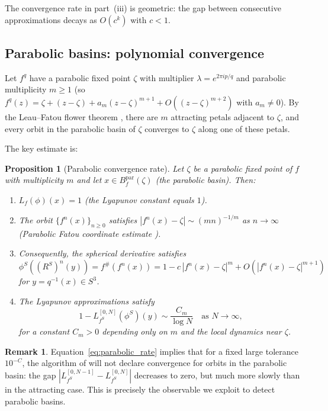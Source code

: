 \documentclass[12pt]{article}
\newtheorem{proposition}[theorem]{Proposition}
\theoremstyle{definition}
\newtheorem{remark}[theorem]{Remark}
\newcommand{\fsh}{f^{\#}}            %
\newcommand{\RS}{R^S}
\begin{document}
The convergence rate in part~(iii) is geometric: the gap between
consecutive approximations decays as $O(c^k)$ with $c < 1$.

\subsection{Parabolic basins: polynomial convergence}

Let $f^q$ have a parabolic fixed point $\zeta$ with multiplier
$\lambda = e^{2\pi ip/q}$ and parabolic multiplicity $m \ge 1$ (so
$f^q(z) = \zeta + (z-\zeta) + a_m(z-\zeta)^{m+1} + O((z-\zeta)^{m+2})$
with $a_m \ne 0$).  By the Leau--Fatou flower theorem \cite{Milnor2006},
there are $m$ attracting petals adjacent to $\zeta$, and every orbit in the
parabolic basin of $\zeta$ converges to $\zeta$ along one of these petals.

The key estimate is:

\begin{proposition}[Parabolic convergence rate]\label{prop:parabolic}
  Let $\zeta$ be a parabolic fixed point of $f$ with multiplicity $m$ and
  let $x \in B_f^{\mathrm{par}}(\zeta)$ (the parabolic basin).  Then:
  \begin{enumerate}[label=(\roman*)]
    \item $L_f(\phi)(x) = 1$ (the Lyapunov constant equals $1$).
    \item The orbit $\{f^n(x)\}_{n\ge 0}$ satisfies
          $|f^n(x) - \zeta| \sim (m n)^{-1/m}$ as $n\to\infty$
          (Parabolic Fatou coordinate estimate \cite{Milnor2006}).
    \item Consequently, the spherical derivative satisfies
          $\phi^S((\RS)^n(y)) = \fsh(f^n(x)) = 1 - c\,|f^n(x)-\zeta|^m +
          O(|f^n(x)-\zeta|^{m+1})$ for $y = q^{-1}(x) \in S^3$.
    \item The Lyapunov approximations satisfy
          \begin{equation}\label{eq:parabolic_rate}
            1 - L_{f^S}^{[0,N]}(\phi^S)(y)
            \sim \frac{C_m}{\log N}
            \quad\text{as }N\to\infty,
          \end{equation}
          for a constant $C_m > 0$ depending only on $m$ and the local
          dynamics near $\zeta$.
  \end{enumerate}
\end{proposition}

\begin{remark}
  Equation~\eqref{eq:parabolic_rate} implies that for a fixed large
  tolerance $10^{-C}$, the algorithm of \cite{Alvarez2023} will not
  declare convergence for orbits in the parabolic basin: the gap
  $|L_{f^S}^{[0,N-1]} - L_{f^S}^{[0,N]}|$ decreases to zero, but
  much more slowly than in the attracting case.  This is precisely the
  observable we exploit to detect parabolic basins.
\end{remark}
\end{document}
